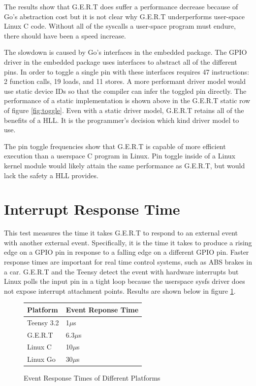 The results show that G.E.R.T does suffer a performance decrease because of
Go's abstraction cost but it is not clear why G.E.R.T underperforms user-space
Linux C code.
Without all of the syscalls a user-space program must endure, there should have
been a speed increase.

The slowdown is caused by Go's interfaces in the embedded package. The GPIO driver
in the embedded package uses interfaces to abstract all of the different pins.
In order to toggle a single pin with these interfaces requires 47 instructions:
2 function calls, 19 loads, and 11 stores. A more performant driver model would
use static device IDs so that the compiler can infer the toggled pin directly.
The performance of a static implementation is shown above in the G.E.R.T static row
of figure \ref{fig:toggle}. Even with a static driver model, G.E.R.T retains all of
the benefits of a HLL. It is the programmer's decision which kind driver model to use.

The pin toggle frequencies show that G.E.R.T is capable of more efficient
execution than a userspace C program in Linux. Pin toggle inside of a Linux
kernel module would likely attain the same performance as G.E.R.T, but would lack
the safety a HLL provides.

\section{Interrupt Response Time}\label{sec:int_time}
This test measures the time it takes G.E.R.T to respond to an external event
with another external event. Specifically, it is the time it takes to produce
a rising edge on a GPIO pin in response to a falling edge on a different GPIO pin.
Faster response times are important for real time control systems, such as ABS brakes
in a car.
G.E.R.T and the Teensy detect the event with hardware interrupts
but Linux polls the input pin in a tight loop because the userspace sysfs
driver does not expose interrupt attachment points.
Results are shown below in figure \ref{fig:RT}.

\begin{figure} [h]
\begin{center}
  \begin{tabular}{ | l | l |}
    \hline
    Platform & Event Reponse Time \\ \hline
    Teensy 3.2 & 1$\mu$s \\ \hline
    G.E.R.T & 6.3$\mu$s \\ \hline
    Linux C & 10$\mu$s \\ \hline
    Linux Go & 30$\mu$s \\
    \hline
  \end{tabular}
\end{center}
  \caption{Event Response Times of Different Platforms}  \label{fig:RT}
\end{figure}

